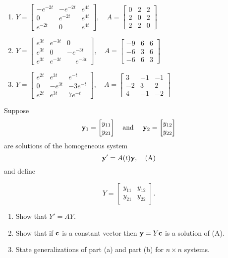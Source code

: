 \documentclass{ximera}
\begin{document}
\begin{problem}
\begin{enumerate}
\item %
 $Y = \begin{bmatrix} -e^{-2t} &
-e^{-2t} & e^{4t}\\ 0 & e^{-2t} & e^{4t} \\
e^{-2t} & 0 & e^{4t}\end{bmatrix}, \quad A =
\begin{bmatrix} 0 & 2 & 2 \\ 2 & 0 & 2\\ 2 & 2 & 0\end{bmatrix}$

\item %
 $Y = \begin{bmatrix}e^{3t} & 
e^{-3t} & 0\\ e^{3t} & 0 & -e^{-3t}\\ e^{3t} &
e^{-3t} & \phantom{-}e^{-3t}\end{bmatrix}, \quad A = \begin{bmatrix}
-9 & 6& 6\\-6& 3 &6\\-6 & 6 & 3\end{bmatrix}$

\item %
 $Y = \left[\begin{array}{crr} e^{2t}&e^{3t}&
e^{-t}\\ 0&-e^{3t}&-3e^{-t}\\ e^{2t}&e^{3t}&7e^{-t}\end{array}\right] ,
\quad A =
\begin{bmatrix} 3 & -1 & -1\\-2 & 3 & 2\\  4 & -1 & -2\end{bmatrix}$
 \end{enumerate}
 \end{problem}

\begin{problem}\label{exer:10.2.9}
 Suppose
$$
{\bf y}_1=\begin{bmatrix}y_{11}\\y_{21}\end{bmatrix}\mbox{\quad and \quad}{\bf
y}_2=\begin{bmatrix}y_{12}\\y_{22}\end{bmatrix}$$ are solutions of the homogeneous system
$$
{\bf y}'=A(t){\bf y},
\quad\text{(A)}
$$
and define

$$Y=
\begin{bmatrix}y_{11} & y_{12} \\ y_{21} & y_{22}\end{bmatrix}.
$$
\begin{enumerate}
\item %
 Show that $Y'=AY$.
\item %
 Show that if ${\bf c}$ is a constant vector then ${\bf y}=
Y{\bf c}$
 is a solution of  (A).
\item %
 State generalizations of  part (a) and part (b) for $n\times n$
systems.
\end{enumerate}
\end{problem}
\end{document}
